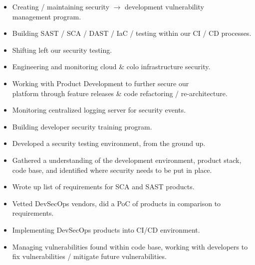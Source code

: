 \documentclass[10pt,a4paper,ragged2e]{rohrbach}
\begin{document}
\begin{paracol}{2}

\begin{itemize}
  \item Creating / maintaining security $\rightarrow$ development vulnerability\\ management program.
  \item Building SAST / SCA / DAST / IaC / testing within our CI / CD processes.
  \item Shifting left our security testing.
  \item Engineering and monitoring cloud \& colo infrastructure security.
  \item Working with Product Development to further secure our\\ platform through feature releases \& code refactoring / re-architecture.
  \item Monitoring centralized logging server for security events.
  \item Building developer security training program.
\end{itemize}

\divider

\begin{itemize}
  \item Developed a security testing environment, from the ground up.
  \item Gathered a understanding of the development environment, product stack, code base, and identified where security needs to be put in place.
  \item Wrote up list of requirements for SCA and SAST products.
  \item Vetted DevSecOps vendors, did a PoC of products in comparison to requirements.
  \item Implementing DevSecOps products into CI/CD environment.
  \item Managing vulnerabilities found within code base, working with developers to fix vulnerabilities / mitigate future vulnerabilities.
\end{itemize}

\divider


\end{paracol}
\end{document}

